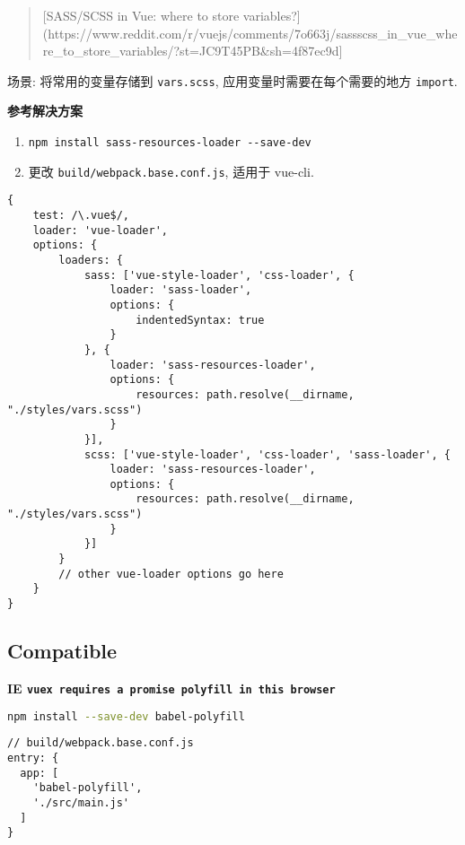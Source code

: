 \begin{quote}
{[}SASS/SCSS in Vue: where to store
variables?{]}(https://www.reddit.com/r/vuejs/comments/7o663j/sassscss\_in\_vue\_where\_to\_store\_variables/?st=JC9T45PB\&sh=4f87ec9d{]}
\end{quote}

场景: 将常用的变量存储到 \lstinline!vars.scss!,
应用变量时需要在每个需要的地方 \lstinline!import!.

\textbf{参考解决方案}

\begin{enumerate}
\def\labelenumi{\arabic{enumi}.}
\tightlist
\item
  \lstinline!npm install sass-resources-loader --save-dev!
\item
  更改 \lstinline!build/webpack.base.conf.js!, 适用于 vue-cli.
\end{enumerate}

\begin{lstlisting}
{
    test: /\.vue$/,
    loader: 'vue-loader',
    options: {
        loaders: {
            sass: ['vue-style-loader', 'css-loader', {
                loader: 'sass-loader',
                options: {
                    indentedSyntax: true
                }
            }, {
                loader: 'sass-resources-loader',
                options: {
                    resources: path.resolve(__dirname, "./styles/vars.scss")
                }
            }],
            scss: ['vue-style-loader', 'css-loader', 'sass-loader', {
                loader: 'sass-resources-loader',
                options: {
                    resources: path.resolve(__dirname, "./styles/vars.scss")
                }
            }]
        }
        // other vue-loader options go here
    }
}
\end{lstlisting}

\subsection{Compatible}\label{compatible}

\textbf{IE \lstinline!vuex requires a promise polyfill in this browser!}

\begin{lstlisting}[language=bash]
npm install --save-dev babel-polyfill
\end{lstlisting}

\begin{lstlisting}
// build/webpack.base.conf.js
entry: {
  app: [
    'babel-polyfill',
    './src/main.js'
  ]
}
\end{lstlisting}

